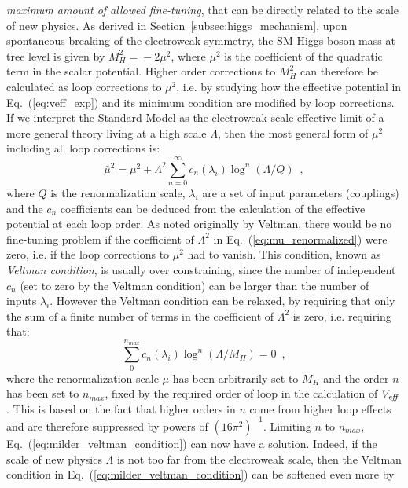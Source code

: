 \documentclass[11pt,prd,onecolumn,aps,floats,superscriptaddress,floatfix,nofootinbib]{revtex4-2}
\begin{document}
\emph{maximum amount of allowed fine-tuning}, that can be directly
related to the scale of new physics. As derived in
Section~\ref{subsec:higgs_mechanism}, upon spontaneous breaking of the
electroweak symmetry, the SM Higgs boson mass at tree level is given
by $M_H^2\!=\!-2\mu^2$, where $\mu^2$ is the coefficient of the
quadratic term in the scalar potential. Higher order corrections to
$M_H^2$ can therefore be calculated as loop corrections to $\mu^2$,
i.e. by studying how the effective potential in
Eq.~(\ref{eq:veff_exp}) and its minimum condition are modified by loop
corrections.  If we interpret the Standard Model as the electroweak
scale effective limit of a more general theory living at a high scale
$\Lambda$, then the most general form of $\mu^2$ including all loop
corrections is:
\begin{equation}
\label{eq:mu_renormalized}
\bar\mu^2=\mu^2+\Lambda^2\sum_{n=0}^{\infty}c_n(\lambda_i)\log^n(\Lambda/Q)
\,\,\,,
\end{equation}
where $Q$ is the renormalization scale, $\lambda_i$ are a set of input
parameters (couplings) and the $c_n$ coefficients can be deduced from
the calculation of the effective potential at each loop order. As
noted originally by Veltman, there would be no fine-tuning problem if
the coefficient of $\Lambda^2$ in Eq.~(\ref{eq:mu_renormalized}) were
zero, i.e. if the loop corrections to $\mu^2$ had to vanish. This
condition, known as \emph{Veltman condition}, is usually over constraining,
since the number of independent $c_n$ (set to zero by the Veltman
condition) can be larger than the number of inputs
$\lambda_i$. However the Veltman condition can be relaxed, by
requiring that only the sum of a finite number of terms in the
coefficient of $\Lambda^2$ is zero, i.e. requiring that:
\begin{equation}
\label{eq:milder_veltman_condition}
\sum_0^{n_{max}}c_n(\lambda_i)\log^n(\Lambda/M_H)=0\,\,\,,
\end{equation}
where the renormalization scale $\mu$ has been arbitrarily set to
$M_H$ and the order $n$ has been set to $n_{max}$, fixed by the
required order of loop in the calculation of $V_{\it eff}$. This is based
on the fact that higher orders in $n$ come from higher loop effects
and are therefore suppressed by powers of $(16\pi^2)^{-1}$. Limiting
$n$ to $n_{max}$, Eq.~(\ref{eq:milder_veltman_condition}) can now have
a solution. Indeed, if the scale of new physics $\Lambda$ is not too
far from the electroweak scale, then the Veltman condition in
Eq.~(\ref{eq:milder_veltman_condition}) can be softened even more by
\end{document}
